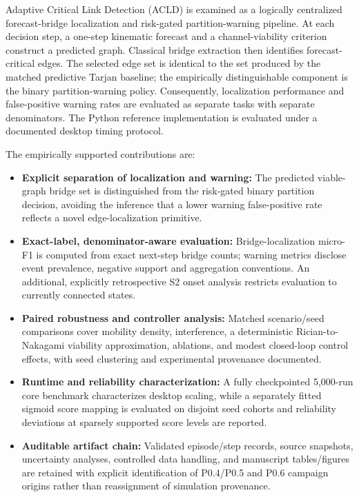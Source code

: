 \documentclass[preprint,12pt]{elsarticle}
\theoremstyle{definition}\newtheorem{definition}{Definition}
\theoremstyle{plain}\newtheorem{theorem}{Theorem}
\theoremstyle{plain}\newtheorem{lemma}{Lemma}
\theoremstyle{plain}\newtheorem{corollary}{Corollary}
\theoremstyle{plain}\newtheorem{assumption}{Assumption}
\theoremstyle{remark}\newtheorem{remark}[theorem]{Remark}
\begin{document}
Adaptive Critical Link Detection (ACLD) is examined as a logically centralized forecast-bridge localization and risk-gated partition-warning pipeline. At each decision step, a one-step kinematic forecast and a channel-viability criterion construct a predicted graph. Classical bridge extraction then identifies forecast-critical edges. The selected edge set is identical to the set produced by the matched predictive Tarjan baseline; the empirically distinguishable component is the binary partition-warning policy. Consequently, localization performance and false-positive warning rates are evaluated as separate tasks with separate denominators. The Python reference implementation is evaluated under a documented desktop timing protocol.

The empirically supported contributions are:
\begin{itemize}[leftmargin=*]
  \item \textbf{Explicit separation of localization and warning:} The predicted viable-graph bridge set is distinguished from the risk-gated binary partition decision, avoiding the inference that a lower warning false-positive rate reflects a novel edge-localization primitive.
  \item \textbf{Exact-label, denominator-aware evaluation:} Bridge-localization micro-F1 is computed from exact next-step bridge counts; warning metrics disclose event prevalence, negative support and aggregation conventions. An additional, explicitly retrospective S2 onset analysis restricts evaluation to currently connected states.
  \item \textbf{Paired robustness and controller analysis:} Matched scenario/seed comparisons cover mobility density, interference, a deterministic Rician-to-Nakagami viability approximation, ablations, and modest closed-loop control effects, with seed clustering and experimental provenance documented.
  \item \textbf{Runtime and reliability characterization:} A fully checkpointed 5,000-run core benchmark characterizes desktop scaling, while a separately fitted sigmoid score mapping is evaluated on disjoint seed cohorts and reliability deviations at sparsely supported score levels are reported.
  \item \textbf{Auditable artifact chain:} Validated episode/step records, source snapshots, uncertainty analyses, controlled data handling, and manuscript tables/figures are retained with explicit identification of P0.4/P0.5 and P0.6 campaign origins rather than reassignment of simulation provenance.
\end{itemize}
\end{document}
